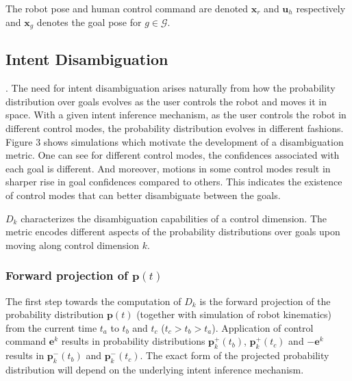 The robot pose and human control command are denoted $\boldsymbol{x}_r$ and $\boldsymbol{u}_h$ respectively and $\boldsymbol{x}_g$ denotes the goal pose for $g \in \mathcal{G}$.
\subsection{Intent Disambiguation}\label{ssec:disamb}. 
The need for intent disambiguation arises naturally from how the probability distribution over goals evolves as the user controls the robot and moves it in space. With a given intent inference mechanism, as the user controls the robot in different control modes, the probability distribution evolves in different fashions. Figure 3 shows simulations which motivate the development of a disambiguation metric. One can see for different control modes, the confidences associated with each goal is different. And moreover, motions in some control modes result in sharper rise in goal confidences compared to others. This indicates the existence of control modes that can better disambiguate between the goals. 

$D_k$ characterizes the disambiguation capabilities of a control dimension. The metric encodes different aspects of the probability distributions over goals upon moving along control dimension $k$. 

\subsubsection{Forward projection of $\boldsymbol{p}(t)$}
The first step towards the computation of $D_k$ is the forward projection of the probability distribution $\boldsymbol{p}(t)$ (together with simulation of robot kinematics) from the current time $t_a$ to $t_b$ and $t_c$ ($t_c > t_b > t_a$). Application of control command $\boldsymbol{e}^k$ results in probability distributions $\boldsymbol{p}^+_k(t_b)$, $\boldsymbol{p}^+_k(t_c)$ and $-\boldsymbol{e}^k$ results in $\boldsymbol{p}^-_k(t_b)$ and $\boldsymbol{p}^-_k(t_c)$. The exact form of the projected probability distribution will depend on the underlying intent inference mechanism. 

